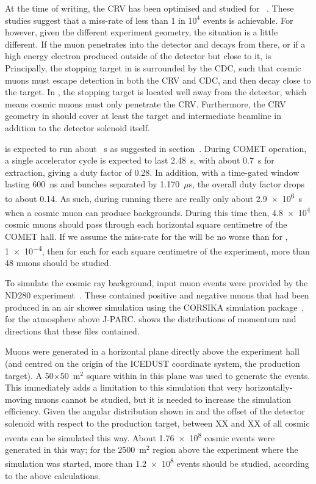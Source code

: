 At the time of writing, the \ac{CRV} has been optimised and studied for \phaseI~\cite{TDR2016,MeCM18Cosmics,DrutskoyCM20}.
These studies suggest that a miss-rate of less than 1 in $10^4$ events is achievable.
For \phaseII however, given the different experiment geometry, the situation is a little different.
If the muon penetrates into the detector and decays from there, or if a high energy electron produced outside of the detector but close to it, is 
Principally, the stopping target in \phaseI is surrounded by the \ac{CDC}, such that cosmic muons must escape detection in both the \ac{CRV} and \ac{CDC}, and then decay close to the target.
In \phaseII, the stopping target is located well away from the detector, which means cosmic muons must only penetrate the \ac{CRV}.
Furthermore, the \ac{CRV} geometry in \phaseII should cover at least the target and intermediate beamline in addition to the detector solenoid itself.

\phaseII is expected to run about \VarRunTime~s as suggested in section~.
During COMET operation, a single accelerator cycle is expected to last 2.48~s, with about 0.7~s for extraction, giving a duty factor of 0.28.
In addition, with a time-gated window lasting 600~ns and bunches separated by 1.170~$\mu$s, the overall duty factor drops to about 0.14.
As such, during \phaseII running there are really only about \num{2.9e6}~s when a cosmic muon can produce backgrounds.
During this time then, \num{4.8e4} cosmic muons should pass through each horizontal square centimetre of the COMET hall.
If we assume the miss-rate for the \phaseII will be no worse than for \phaseI, \ie \num{1e-4}, then for each for each square centimetre of the experiment, more than 48 muons should be studied.

\FigBgCosmicBeam
\FigBgCosmicMomenta
To simulate the cosmic ray background, input muon events were provided by the ND280 experiment~\cite{George:2010aca}.
These contained positive and negative muons that had been produced in an air shower simulation using the CORSIKA simulation package~\cite{Corsika}, for the atmosphere above J-PARC.
 shows the distributions of momentum and directions that these files contained.

Muons were generated in a horizontal plane directly above the experiment hall (and centred on the origin of the ICEDUST coordinate system, the production target).
A 50$\times$50~m${}^2$ square within in this plane was used to generate the events.
This immediately adds a limitation to this simulation that very horizontally-moving muons cannot be studied, but it is needed to increase the simulation efficiency.
Given the angular distribution shown in  and the offset of the detector solenoid with respect to the production target, between XX and XX of all cosmic events can be simulated this way.
About \num{1.76e8} cosmic events were generated in this way; for the 2500~m${}^2$ region above the experiment where the simulation was started, more than \num{1.2e8} events should be studied, according to the above calculations.

